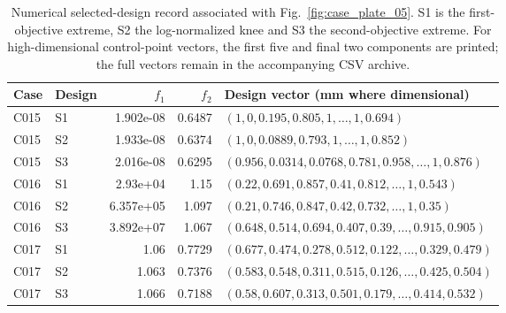 \begin{table}[p]
\centering\scriptsize
\caption{Numerical selected-design record associated with Fig.~\ref{fig:case_plate_05}. S1 is the first-objective extreme, S2 the log-normalized knee and S3 the second-objective extreme. For high-dimensional control-point vectors, the first five and final two components are printed; the full vectors remain in the accompanying CSV archive.}
\label{tab:case_plate_05}
\setlength{\tabcolsep}{3.2pt}
\begin{tabularx}{\textwidth}{llrr>{\raggedright\arraybackslash}X}
\toprule Case & Design & $f_1$ & $f_2$ & Design vector (mm where dimensional) \\
\midrule
C015 & S1 & 1.902e-08 & 0.6487 & $(1, 0, 0.195, 0.805, 1, \ldots, 1, 0.694)$ \\
C015 & S2 & 1.933e-08 & 0.6374 & $(1, 0, 0.0889, 0.793, 1, \ldots, 1, 0.852)$ \\
C015 & S3 & 2.016e-08 & 0.6295 & $(0.956, 0.0314, 0.0768, 0.781, 0.958, \ldots, 1, 0.876)$ \\
C016 & S1 & 2.93e+04 & 1.15 & $(0.22, 0.691, 0.857, 0.41, 0.812, \ldots, 1, 0.543)$ \\
C016 & S2 & 6.357e+05 & 1.097 & $(0.21, 0.746, 0.847, 0.42, 0.732, \ldots, 1, 0.35)$ \\
C016 & S3 & 3.892e+07 & 1.067 & $(0.648, 0.514, 0.694, 0.407, 0.39, \ldots, 0.915, 0.905)$ \\
C017 & S1 & 1.06 & 0.7729 & $(0.677, 0.474, 0.278, 0.512, 0.122, \ldots, 0.329, 0.479)$ \\
C017 & S2 & 1.063 & 0.7376 & $(0.583, 0.548, 0.311, 0.515, 0.126, \ldots, 0.425, 0.504)$ \\
C017 & S3 & 1.066 & 0.7188 & $(0.58, 0.607, 0.313, 0.501, 0.179, \ldots, 0.414, 0.532)$ \\
\bottomrule
\end{tabularx}
\end{table}
